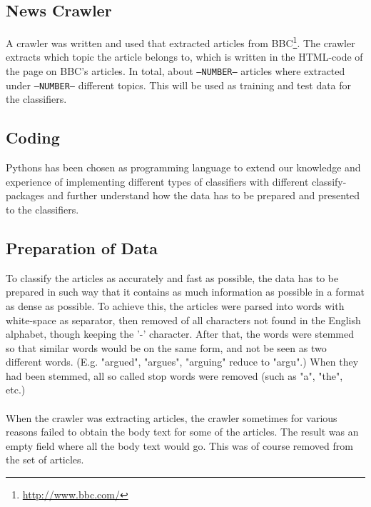 \subsection{News Crawler}
	A crawler was written and used that extracted articles from BBC\footnote{\url{http://www.bbc.com/}}. The crawler extracts which topic the article belongs to, which is written in the HTML-code of the page on BBC's articles. In total, about \texttt{--NUMBER--} articles where extracted under \texttt{--NUMBER--} different topics. This will be used as training and test data for the classifiers.
	\subsection{Coding}
	Pythons has been chosen as programming language to extend our knowledge and experience of implementing different types of classifiers with different classify-packages and further understand how the data has to be prepared and presented to the classifiers.
	\subsection{Preparation of Data}
	To classify the articles as accurately and fast as possible, the data has to be prepared in such way that it contains as much information as possible in a format as dense as possible. To achieve this, the articles were parsed into words with white-space as separator, then removed of all characters not found in the English alphabet, though keeping the '-' character. After that, the words were stemmed so that similar words would be on the same form, and not be seen as two different words. (E.g. "argued", "argues", "arguing" reduce to "argu".) When they had been stemmed, all so called stop words were removed (such as "a", "the", etc.)
	\\\\
	When the crawler was extracting articles, the crawler sometimes for various reasons failed to obtain the body text for some of the articles. The result was an empty field where all the body text would go. This was of course removed from the set of articles.
